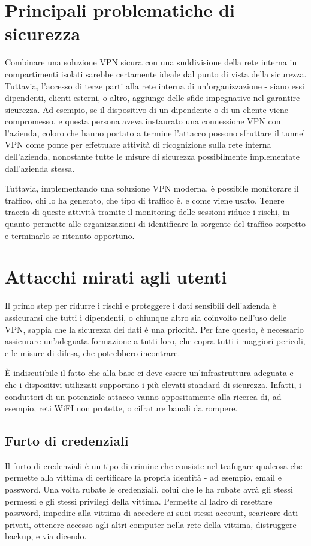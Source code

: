 \section{Principali problematiche di sicurezza}

Combinare una soluzione VPN sicura con una suddivisione della rete interna in compartimenti isolati sarebbe certamente ideale dal punto di vista della sicurezza.
Tuttavia, l'accesso di terze parti alla rete interna di un'organizzazione - siano essi dipendenti, clienti esterni, o altro, aggiunge delle sfide impegnative nel garantire sicurezza.
Ad esempio, se il dispositivo di un dipendente o di un cliente viene compromesso, e questa persona aveva instaurato una connessione VPN con l'azienda, coloro che hanno portato a termine l'attacco possono sfruttare il tunnel VPN come ponte per effettuare attività di ricognizione sulla rete interna dell'azienda, nonostante tutte le misure di sicurezza possibilmente implementate dall'azienda stessa.

Tuttavia, implementando una soluzione VPN moderna, è possibile monitorare il traffico, chi lo ha generato, che tipo di traffico è, e come viene usato. Tenere traccia di queste attività tramite il monitoring delle sessioni riduce i rischi, in quanto permette alle organizzazioni di identificare la sorgente del traffico sospetto e terminarlo se ritenuto opportuno.

\section{Attacchi mirati agli utenti}

Il primo step per ridurre i rischi e proteggere i dati sensibili dell'azienda è assicurarsi che tutti i dipendenti, o chiunque altro sia coinvolto nell'uso delle VPN, sappia che la sicurezza dei dati è una priorità.
Per fare questo, è necessario assicurare un'adeguata formazione a tutti loro, che copra tutti i maggiori pericoli, e le misure di difesa, che potrebbero incontrare.

È indiscutibile il fatto che alla base ci deve essere un'infrastruttura adeguata e che i dispositivi utilizzati supportino i più elevati standard di sicurezza. Infatti, i conduttori di un potenziale attacco vanno appositamente alla ricerca di, ad esempio, reti WiFI non protette, o cifrature banali da rompere.

\subsection{Furto di credenziali}
Il furto di credenziali è un tipo di crimine che consiste nel trafugare qualcosa che permette alla vittima di certificare la propria identità - ad esempio, email e password.
Una volta rubate le credenziali, colui che le ha rubate avrà gli stessi permessi e gli stessi privilegi della vittima.
Permette al ladro di resettare password, impedire alla vittima di accedere ai suoi stessi account, scaricare dati privati, ottenere accesso agli altri computer nella rete della vittima, distruggere backup, e via dicendo.

